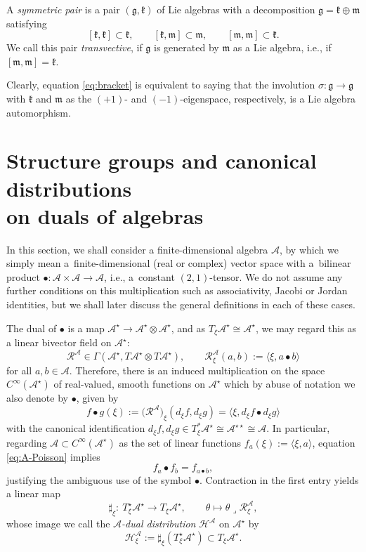 \documentclass[10pt,a4paper]{amsart}
\numberwithin{equation}{section}
\newcommand{\be}{\begin{equation}}
\newcommand{\ee}{\end{equation}}
\newcommand{\lra}{\longrightarrow}
\newcommand{\hh}{\mathcal{H}}
\newcommand{\m}{\mathfrak{m}}
\newcommand{\g}{{\mathfrak{g}}}
\renewcommand{\k}{{\mathfrak k}}
\renewcommand{\m}{{\mathfrak m}}
\newcommand{\cR}{\mathcal{R}}
\newcommand{\cA}{\mathcal{A}}
\begin{document}
\begin{Definition} \label{df:symm}
A {\em symmetric pair} is a pair $(\g, \k)$ of Lie algebras with a decomposition $\g = \k \oplus \m$ satisfying \be \label{eq:bracket}
{}[\k, \k] \subset \k, \qquad [\k, \m] \subset \m, \qquad [\m, \m] \subset \k.
\ee
We call this pair {\em transvective}, if $\g$ is generated by $\m$ as a Lie algebra, i.e., if $[\m, \m] = \k$.
\end{Definition}

Clearly, equation \eqref{eq:bracket} is equivalent to saying that the involution $\sigma\colon \g \to \g$ with $\k$ and $\m$ as the $(+1)$- and $(-1)$-eigenspace, respectively, is a Lie algebra automorphism.

\section[Structure groups and canonical distributions on duals of algebras]{Structure groups and canonical distributions\\ on duals of algebras}\label{sec:structure-general}

In this section, we shall consider a finite-dimensional algebra $\cA$, by which we simply mean a~finite-dimensional (real or complex) vector space with a~bilinear product $\bullet\colon \cA \times \cA \to \cA$, i.e., a~constant $(2,1)$-tensor.
We do not assume any further conditions on this multiplication such as associativity, Jacobi or Jordan identities, but we shall later discuss the general definitions in each of these cases.

The dual of $\bullet$ is a map $\cA^\star \to \cA^\star \otimes \cA^\star$, and as $T_\xi \cA^\star \cong \cA^\star$, we may regard this as a linear bivector field on $\cA^\star$:
\be \label{eq:R-bivectorfield}
\cR^\cA \in \Gamma(\cA^\star, T\cA^\star \otimes T\cA^\star), \qquad \cR^\cA_\xi (a, b) := \langle \xi, a \bullet b\rangle
\ee
for all $a,b \in \cA$.
Therefore, there is an induced multiplication on the space $C^\infty(\cA^\star)$ of real-valued, smooth functions on $\cA^{\star}$ which by abuse of notation we also denote by $\bullet$, given by
\be \label{eq:A-Poisson}
f \bullet g(\xi) := \big(\cR^\cA\big)_\xi (d_\xi f, d_\xi g) = \langle \xi, d_\xi f \bullet d_\xi g \rangle
\ee
with the canonical identification $d_\xi f, d_\xi g \in T^\ast_\xi \cA^\star \cong \cA^{\star\star} \cong \cA$. In particular, regarding $ \cA \subset C^\infty(\cA^\star) $ as the set of linear functions $f_a(\xi) := \langle \xi, a\rangle$, equation \eqref{eq:A-Poisson} implies
\[ %
f_a \bullet f_b = f_{a \bullet b},
\]
justifying the ambiguous use of the symbol $\bullet$. %
Contraction in the first entry yields a linear map
\be \label{eq:sharp-xi}
\sharp_\xi\colon\ T^\star_\xi \cA^\star \lra T_\xi \cA^\star, \qquad \theta \longmapsto \theta \lrcorner \cR^\cA_\xi,
\ee
whose image we call the {\em $\cA$-dual distribution} $\hh^\cA$ on $\cA^\star$ by
\be \label{eq:grad-dist}
\hh^\cA_\xi := \sharp_\xi(T_\xi^\star \cA^\star) \subset T_\xi \cA^\star.
\ee
\end{document}
